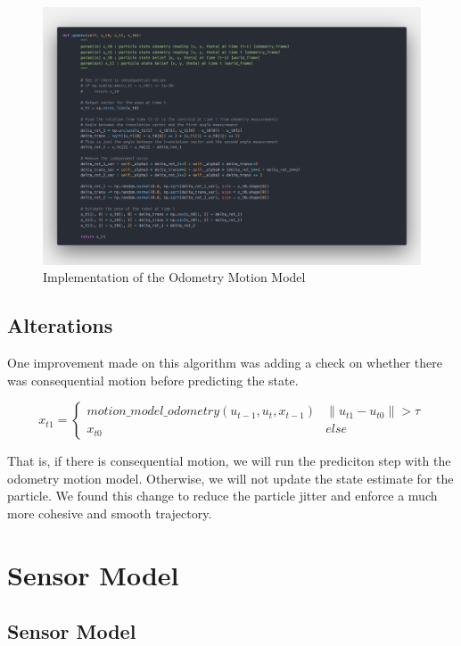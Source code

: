 \documentclass[12pt, a4paper]{article}
\begin{document}
\begin{figure}
  \begin{center}
    \includegraphics[width=1.0\textwidth]{./results/motion_model_2.png}
    \caption{Implementation of the Odometry Motion Model}
  \end{center}
\end{figure}

\subsection{Alterations}
One improvement made on this algorithm was adding a check on whether there was consequential motion before predicting the state.

\[ 
x_{t1} = \left\{
\begin{array}{ll}
    motion\_model\_odometry(u_{t-1}, u_t, x_{t-1}) & \lVert u_{t1} - u_{t0} \rVert > \tau \\
    x_{t0} & else
\end{array} 
\right. 
\]

That is, if there is consequential motion, we will run the prediciton step with the odometry motion model. Otherwise, we will not update the state estimate for the particle. We found this change to reduce the particle jitter and enforce a much more cohesive and smooth trajectory.

\clearpage
\section{Sensor Model}
\subsection{Sensor Model}
\end{document}
